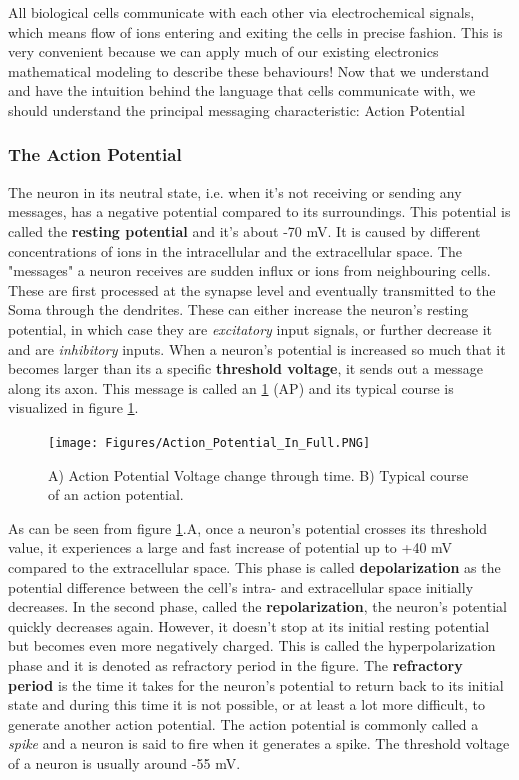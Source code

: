 All biological cells communicate with each other via electrochemical signals, which means flow of ions entering and exiting the cells in precise fashion. This is very convenient because we can apply much of our existing electronics mathematical modeling to describe these behaviours! Now that we understand and have the intuition behind the language that cells communicate with, we should understand the principal messaging characteristic: Action Potential

\subsubsection{The Action Potential}

The neuron in its neutral state, i.e. when it's not receiving or sending any messages, has a negative potential compared to its surroundings. This potential is called the \textbf{resting potential} and it's about -70 mV. It is caused by different concentrations of ions in the intracellular and the extracellular space. The "messages" a neuron receives are sudden influx or ions from neighbouring cells. These are first processed at the synapse level and eventually transmitted to the Soma through the dendrites. These can either increase the neuron's resting potential, in which case they are \textit{excitatory} input signals, or further decrease it and are \textit{inhibitory} inputs. When a neuron's potential is increased so much that it becomes larger than its a specific \textbf{threshold voltage}, it sends out a message along its axon. This message is called an \ref{fig:action_potential} (AP) and its typical course is visualized in figure \ref{fig:action_potential}. 

\begin{figure}
    \centering
    \texttt{[image: Figures/Action\_Potential\_In\_Full.PNG]}
    \caption{A) Action Potential Voltage change through time. B) Typical course of an action potential.}
    \label{fig:action_potential}
\end{figure}

As can be seen from figure \ref{fig:action_potential}.A, once a neuron's potential crosses its threshold value, it experiences a large and fast increase of potential up to +40 mV compared to the extracellular space. This phase is called \textbf{depolarization} as the potential difference between the cell's intra- and extracellular space initially decreases. In the second phase, called the \textbf{repolarization}, the neuron's potential quickly decreases again. However, it doesn't stop at its initial resting potential but becomes even more negatively charged. This is called the hyperpolarization phase and it is denoted as refractory period in the figure. The \textbf{refractory period} is the time it takes for the neuron's potential to return back to its initial state and during this time it is not possible, or at least a lot more difficult, to generate another action potential. The action potential is commonly called a \textit{spike} and a neuron is said to fire when it generates a spike. The threshold voltage of a neuron is usually around -55 mV.\\

